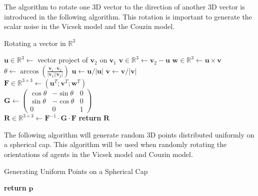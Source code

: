 \documentclass[11pt,twoside]{report}
\begin{document}
The algorithm to rotate one 3D vector to the direction of another 3D vector is introduced in the following algorithm. This rotation is important to generate the scalar noise in the Vicsek model and the Couzin model.


\begin{algorithm}
\caption{Rotating a vector in $\mathbb{R}^3$}
\label{alg:geometry-rotate}
\begin{algorithmic}
	
	 
	\State $\mathbf{u} \in \mathbb{R}^3 \gets$ vector project of $\mathbf{v}_2$ on $\mathbf{v}_1$ 
	\State $\mathbf{v} \in \mathbb{R}^3 \gets \mathbf{v}_2 - \mathbf{u}$  
	\State $\mathbf{w} \in \mathbb{R}^3 \gets \mathbf{u} \times \mathbf{v}$
	\State $\theta \gets 
	\arccos( \frac{\mathbf{v}_1 \cdot \mathbf{v}_2} { |\mathbf{v}_1| |\mathbf{v}_2|})
	$ 
	\State $\mathbf{u} \gets \mathbf{u} / |\mathbf{u}|$
	\State $\mathbf{v} \gets \mathbf{v} / |\mathbf{v}|$ \\
	\State $\mathbf{F} \in \mathbb{R}^{3 \times 3} \gets
	(\mathbf{u}^T; \mathbf{v}^T; \mathbf{w}^T)
	$  \\
	\State $
	\mathbf{G} \gets \left(
	\begin{matrix}
		\cos \theta & -\sin \theta & 0 \\
		\sin \theta & -\cos \theta & 0 \\
		0 & 0 & 1
	\end{matrix}
	\right)
	$\\
	\State $\mathbf{R} \in \mathbb{R}^{3 \times 3} \gets
	\mathbf{F}^{-1} \cdot \mathbf{G} \cdot \mathbf{F}
	$
	\State \textbf{return} $\mathbf{R}$
	\EndProcedure
\end{algorithmic}
\end{algorithm}



The following algorithm will generate random 3D points distributed uniformly on a spherical cap. This algorithm will be used when randomly rotating the orientations of agents in the Vicsek model and Couzin model.


\begin{algorithm}
\caption{Generating Uniform Points on a Spherical Cap}
\label{alg:geometry-rand-cap}
\begin{algorithmic}
	
	
	\State \textbf{return} $\mathbf{p}$
	\EndProcedure
	
\end{algorithmic}
\end{algorithm}
\end{document}
